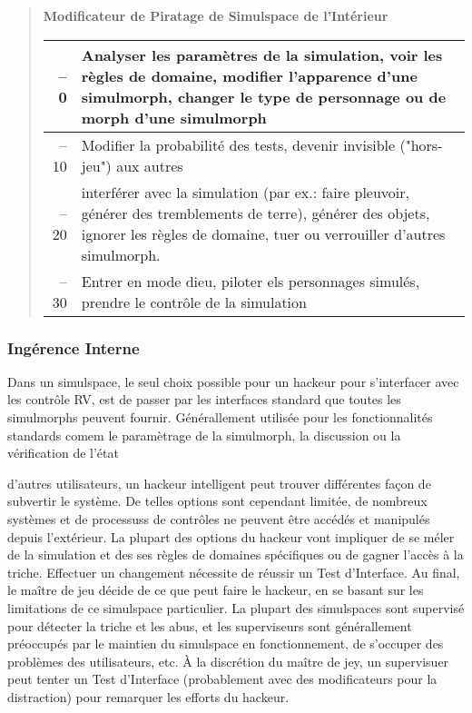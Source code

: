 \begin{quotation} \textbf{Modificateur de Piratage de Simulspace de l'Intérieur} \\ \begin{tabularx}{\textwidth}{|rX|} \hline

–0 &Analyser les paramètres de la simulation, voir les règles de domaine, modifier l'apparence d'une simulmorph, changer le type de personnage ou de morph d'une simulmorph\\ \hline

–10 &Modifier la probabilité des tests, devenir invisible ("hors-jeu") aux autres\\ \hline

–20 &interférer avec la simulation (par ex.: faire pleuvoir, générer des tremblements de terre), générer des objets, ignorer les règles de domaine, tuer ou verrouiller d'autres simulmorph.\\ \hline

–30 &Entrer en mode dieu, piloter els personnages simulés, prendre le contrôle de la simulation\\ \hline

\end{tabularx} \end{quotation} 

\subsubsection{Ingérence Interne} 

Dans un simulspace, le seul choix possible pour un hackeur pour s'interfacer avec les contrôle RV, est de passer par les interfaces standard que toutes les simulmorphs peuvent fournir. Générallement utilisée pour les fonctionnalités standards comem le paramètrage de la simulmorph, la discussion ou la vérification de l'état  

d'autres utilisateurs, un hackeur intelligent peut trouver différentes façon de subvertir le système. De telles options sont cependant limitée, de nombreux systèmes et de processuss de contrôles ne peuvent être accédés et manipulés depuis l'extérieur. La plupart des options du hackeur vont impliquer de se méler de la simulation et des ses règles de domaines spécifiques ou de gagner l'accès à la triche. Effectuer un changement nécessite de réussir un Test d'Interface. Au final, le maître de jeu décide de ce que peut faire le hackeur, en se basant sur les limitations de ce simulspace particulier. La plupart des simulspaces sont supervisé pour détecter la triche et les abus, et les superviseurs sont générallement préoccupés par le maintien du simulspace en fonctionnement, de s'occuper des problèmes des utilisateurs, etc. À la discrétion du maître de jey, un supervisuer peut tenter un Test d'Interface (probablement avec des modificateurs pour la distraction) pour remarquer les efforts du hackeur. 

